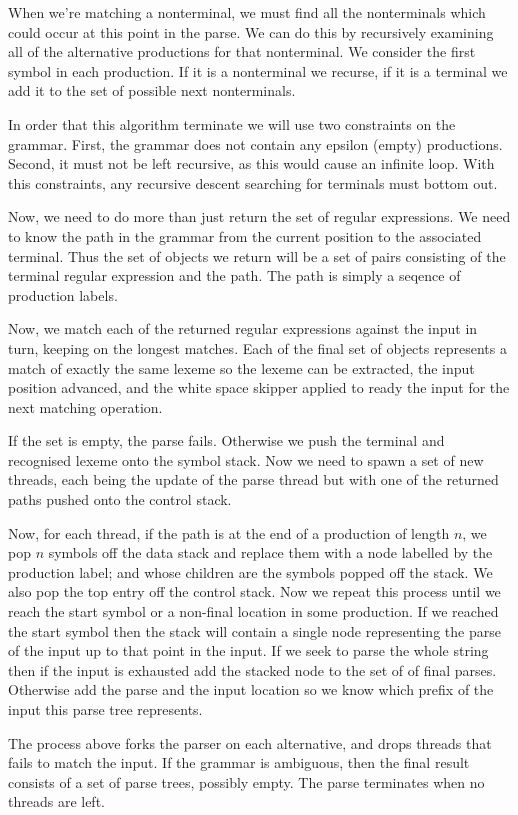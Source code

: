 \documentclass[oneside]{book}
\begin{document}
When we're matching a nonterminal, we must find all the nonterminals which could
occur at this point in the parse. We can do this by recursively examining all of the
alternative productions for that nonterminal. We consider the first symbol in each
production. If it is a nonterminal we recurse, if it is a terminal we add it to
the set of possible next nonterminals.

In order that this algorithm terminate we will use two constraints on the grammar.
First, the grammar does not contain any epsilon (empty) productions.
Second, it must not be left recursive, as this would cause an infinite loop.
With this constraints, any recursive descent searching for terminals must bottom out.

Now, we need to do more than just return the set of regular expressions.
We need to know the path in the grammar from the current position to the
associated terminal. Thus the set of objects we return will be a set
of pairs consisting of the terminal regular expression and the path.
The path is simply a seqence of production labels.

Now, we match each of the returned regular expressions against the input
in turn, keeping on the longest matches. Each of the final set of objects
represents a match of exactly the same lexeme so the lexeme can be extracted,
the input position advanced, and the white space skipper applied to ready
the input for the next matching operation.

If the set is empty, the parse fails. Otherwise we push the terminal
and recognised lexeme onto the symbol stack. Now we need to spawn
a set of new threads, each being the update of the parse thread
but with one of the returned paths pushed onto the control stack.

Now, for each thread, if the path is at the end of a production
of length $n$, we pop $n$ symbols off the data stack and replace
them with a node labelled by the production label; and whose
children are the symbols popped off the stack. We also pop the
top entry off the control stack. Now we repeat this process
until we reach the start symbol or a non-final location in
some production. If we reached the start symbol 
then the stack will contain a single node representing
the parse of the input up to that point in the input.
If we seek to parse the whole string then if the input is exhausted
add the stacked node to the set of of final parses.
Otherwise add the parse and the input location so we know which prefix
of the input this parse tree represents.

The process above forks the parser on each alternative, and drops
threads that fails to match the input. If the grammar is ambiguous,
then the final result consists of a set of parse trees, possibly empty.
The parse terminates when no threads are left.



\appendix
\backmatter
\end{document}

